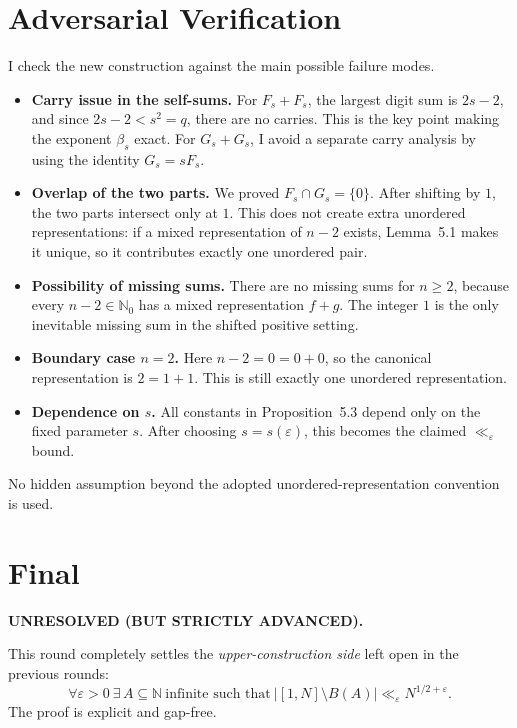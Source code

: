 \section{Adversarial Verification}
\label{sec:round5-adversarial}
I check the new construction against the main possible failure modes.
\begin{itemize}
\item \textbf{Carry issue in the self-sums.} For $F_s+F_s$, the largest digit sum is $2s-2$, and since $2s-2<s^2=q$, there are no carries. This is the key point making the exponent $\beta_s$ exact. For $G_s+G_s$, I avoid a separate carry analysis by using the identity $G_s=sF_s$.

\item \textbf{Overlap of the two parts.} We proved $F_s\cap G_s=\{0\}$. After shifting by $1$, the two parts intersect only at $1$. This does not create extra unordered representations: if a mixed representation of $n-2$ exists, Lemma~5.1 makes it unique, so it contributes exactly one unordered pair.

\item \textbf{Possibility of missing sums.} There are no missing sums for $n\ge 2$, because every $n-2\in\mathbb N_0$ has a mixed representation $f+g$. The integer $1$ is the only inevitable missing sum in the shifted positive setting.

\item \textbf{Boundary case $n=2$.} Here $n-2=0=0+0$, so the canonical representation is $2=1+1$. This is still exactly one unordered representation.

\item \textbf{Dependence on $s$.} All constants in Proposition~5.3 depend only on the fixed parameter $s$. After choosing $s=s(\varepsilon)$, this becomes the claimed $\ll_\varepsilon$ bound.
\end{itemize}
No hidden assumption beyond the adopted unordered-representation convention is used.

\section{Final}
\label{sec:round5-final}
\textbf{UNRESOLVED (BUT STRICTLY ADVANCED).}

This round completely settles the \emph{upper-construction side} left open in the previous rounds:
\[
\forall\varepsilon>0\ \exists\, A\subseteq\mathbb N\ \text{infinite such that}\ |[1,N]\setminus B(A)|\ll_{\varepsilon}N^{1/2+\varepsilon}.
\]
The proof is explicit and gap-free.


